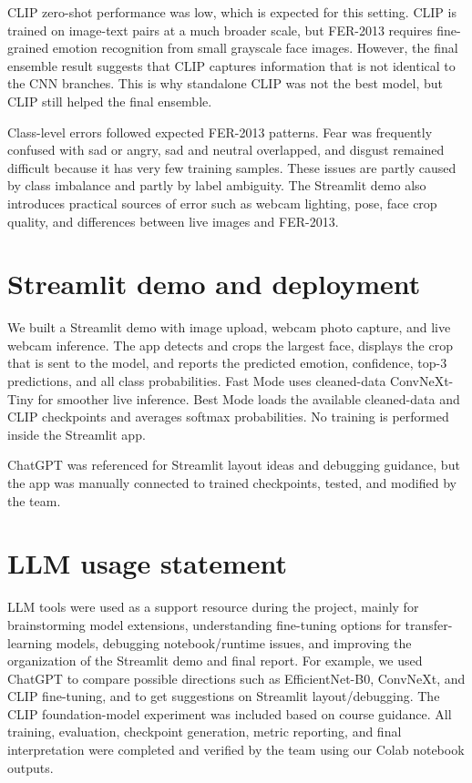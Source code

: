\documentclass{article}
\begin{document}
CLIP zero-shot performance was low, which is expected for this setting. CLIP is trained on image-text pairs at a much broader scale, but FER-2013 requires fine-grained emotion recognition from small grayscale face images. However, the final ensemble result suggests that CLIP captures information that is not identical to the CNN branches. This is why standalone CLIP was not the best model, but CLIP still helped the final ensemble.

Class-level errors followed expected FER-2013 patterns. Fear was frequently confused with sad or angry, sad and neutral overlapped, and disgust remained difficult because it has very few training samples. These issues are partly caused by class imbalance and partly by label ambiguity. The Streamlit demo also introduces practical sources of error such as webcam lighting, pose, face crop quality, and differences between live images and FER-2013.

\section{Streamlit demo and deployment}

We built a Streamlit demo \citep{streamlitdocs} with image upload, webcam photo capture, and live webcam inference. The app detects and crops the largest face, displays the crop that is sent to the model, and reports the predicted emotion, confidence, top-3 predictions, and all class probabilities. Fast Mode uses cleaned-data ConvNeXt-Tiny for smoother live inference. Best Mode loads the available cleaned-data and CLIP checkpoints and averages softmax probabilities. No training is performed inside the Streamlit app.

ChatGPT was referenced for Streamlit layout ideas and debugging guidance, but the app was manually connected to trained checkpoints, tested, and modified by the team.

\section{LLM usage statement}

LLM tools were used as a support resource during the project, mainly for brainstorming model extensions, understanding fine-tuning options for transfer-learning models, debugging notebook/runtime issues, and improving the organization of the Streamlit demo and final report. For example, we used ChatGPT to compare possible directions such as EfficientNet-B0, ConvNeXt, and CLIP fine-tuning, and to get suggestions on Streamlit layout/debugging. The CLIP foundation-model experiment was included based on course guidance. All training, evaluation, checkpoint generation, metric reporting, and final interpretation were completed and verified by the team using our Colab notebook outputs.
\end{document}
